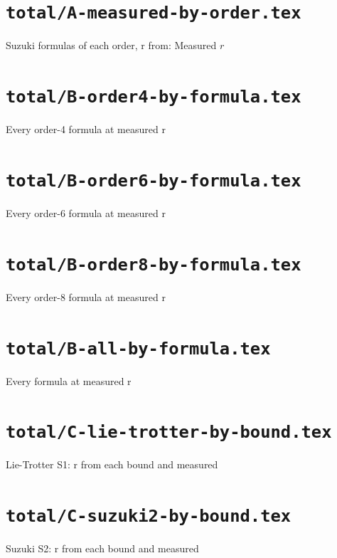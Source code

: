 \documentclass{article}
\begin{document}
\section*{\texttt{total/A-measured-by-order.tex}}
Suzuki formulas of each order, r from: Measured $r$\par\medskip

\clearpage

\section*{\texttt{total/B-order4-by-formula.tex}}
Every order-4 formula at measured r\par\medskip

\clearpage

\section*{\texttt{total/B-order6-by-formula.tex}}
Every order-6 formula at measured r\par\medskip

\clearpage

\section*{\texttt{total/B-order8-by-formula.tex}}
Every order-8 formula at measured r\par\medskip

\clearpage

\section*{\texttt{total/B-all-by-formula.tex}}
Every formula at measured r\par\medskip

\clearpage

\section*{\texttt{total/C-lie-trotter-by-bound.tex}}
Lie-Trotter S1: r from each bound and measured\par\medskip

\clearpage

\section*{\texttt{total/C-suzuki2-by-bound.tex}}
Suzuki S2: r from each bound and measured\par\medskip

\clearpage
\end{document}
